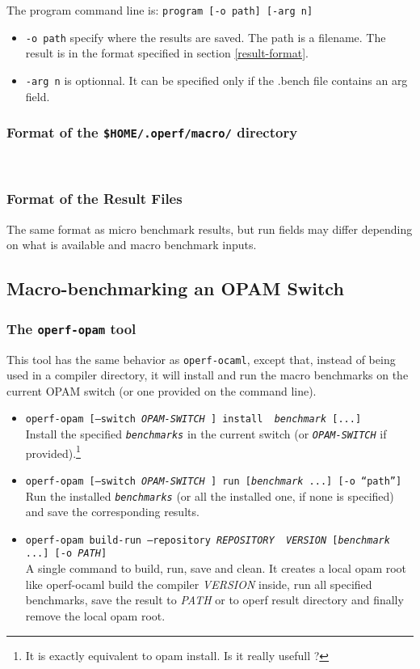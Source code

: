 \documentclass[11pt,a4paper]{article}
\begin{document}
The program command line is:
{\tt program [-o path] [-arg n]}
\begin{itemize}
\item {\tt -o path} specify where the results are saved. The path is a
  filename. The result is in the format specified in section
  \ref{result-format}.
\item {\tt -arg n} is optionnal. It can be specified only if the
  .bench file contains an arg field.
\end{itemize}

\subsubsection{Format of the {\tt \$HOME/.operf/macro/} directory}
~\vspace{4cm}~

\subsubsection{Format of the Result Files}

The same format as micro benchmark results, but run fields may differ
depending on what is available and macro benchmark inputs.
~\vspace{4cm}~

\subsection{Macro-benchmarking an OPAM Switch}

\subsubsection{The {\tt operf-opam} tool}

This tool has the same behavior as {\tt operf-ocaml}, except that,
instead of being used in a compiler directory, it will install and run
the macro benchmarks on the current OPAM switch (or one provided on
the command line).

\begin{itemize}
\item {\tt operf-opam [--switch {\em OPAM-SWITCH} ] install {\em
    benchmark} [...]}\\ Install the specified {\tt\em benchmarks} in
  the current switch (or {\tt\em OPAM-SWITCH} if
  provided).\footnote{It is exactly equivalent to opam install. Is it really usefull ?}
\item {\tt operf-opam [--switch {\em OPAM-SWITCH} ] run [{\em benchmark} ...] [-o ``path'']}\\
  Run the installed {\tt\em benchmarks} (or all the installed one, if none
  is specified) and save the corresponding results.
\item {\tt operf-opam build-run --repository {\em REPOSITORY} {\em
    VERSION} [{\em benchmark} ...] [-o {\em PATH}]}\\ A single command
  to build, run, save and clean.  It creates a local opam root like
  operf-ocaml build the compiler {\em VERSION} inside, run all
  specified benchmarks, save the result to {\em PATH} or to operf
  result directory and finally remove the local opam root.
\end{itemize}
\end{document}
